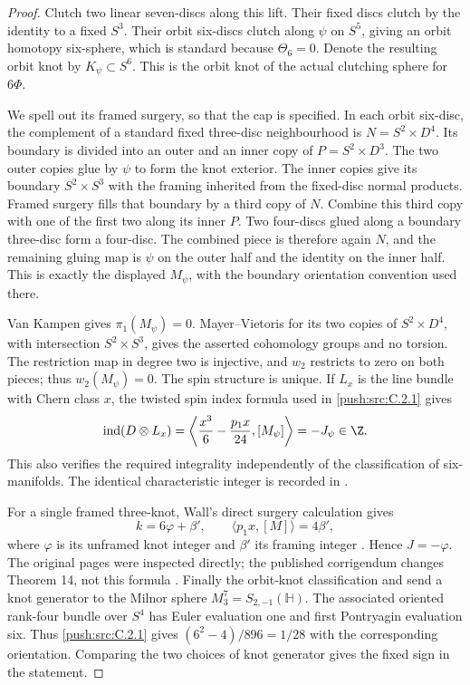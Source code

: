 \begin{proof}
Clutch two linear seven-discs along this lift. Their fixed discs
clutch by the identity to a fixed $S^3$. Their orbit six-discs
clutch along $\psi$ on $S^5$, giving an orbit homotopy six-sphere,
which is standard because $\Theta_6=0$. Denote the resulting
orbit knot by $K_\psi\subset S^6$. This is the orbit knot of
the actual clutching sphere for $6\Phi$.

We spell out its framed surgery, so that the cap is specified.
In each orbit six-disc, the complement of a standard fixed
three-disc neighbourhood is $N=S^2\times D^4$. Its boundary
is divided into an outer and an inner copy of $P=S^2\times D^3$.
The two outer copies glue by $\psi$ to form the knot exterior.
The inner copies give its boundary $S^2\times S^3$ with the
framing inherited from the fixed-disc normal products. Framed
surgery fills that boundary by a third copy of $N$.
Combine this third copy with one of the first two along its
inner $P$. Two four-discs glued along a boundary three-disc
form a four-disc. The combined piece is therefore again $N$,
and the remaining gluing map is $\psi$ on the outer half and
the identity on the inner half. This is exactly the displayed
$M_\psi$, with the boundary orientation convention used there.

Van Kampen gives $\pi_1(M_\psi)=0$. Mayer--Vietoris for its
two copies of $S^2\times D^4$, with intersection $S^2\times S^3$,
gives the asserted cohomology groups and no torsion. The
restriction map in degree two is injective, and $w_2$ restricts
to zero on both pieces; thus $w_2(M_\psi)=0$. The spin
structure is unique. If $L_x$ is the line bundle with Chern
class $x$, the twisted spin index formula used in \ref{push:src:C.2.1} gives
\[
 \operatorname{ind}(D\otimes L_x)
 =\left\langle\frac{x^3}{6}-\frac{p_1x}{24},[M_\psi]\right\rangle
 =-J_\psi\in\Z.
\]
This also verifies the required integrality independently of the
classification of six-manifolds. The identical characteristic
integer is recorded in \citet[Section 3, page 1911]{Olbermann2010D}.

For a single framed three-knot, Wall's direct surgery calculation
gives
\[
 k=6\varphi+\beta',\qquad \langle p_1x,[M]\rangle=4\beta',
\]
where $\varphi$ is its unframed knot integer and $\beta'$ its
framing integer
\citep[Theorem 4, pages 360--361]{Wall1966VE}.
Hence $J=-\varphi$. The original pages were inspected directly;
the published corrigendum changes Theorem 14, not this formula
\citep{Wall1967CorrE}. Finally the orbit-knot classification and
\citet[Example 7.14 and Proposition 7.15]{Davis1982D} send a
knot generator to the Milnor sphere $M^7_3=S_{2,-1}(\mathbb H)$.
The associated oriented rank-four bundle over $S^4$ has Euler
evaluation one and first Pontryagin evaluation six. Thus \ref{push:src:C.2.1}
gives $(6^2-4)/896=1/28$ with the corresponding
orientation. Comparing the two choices of knot generator gives
the fixed sign in the statement.


\end{proof}
